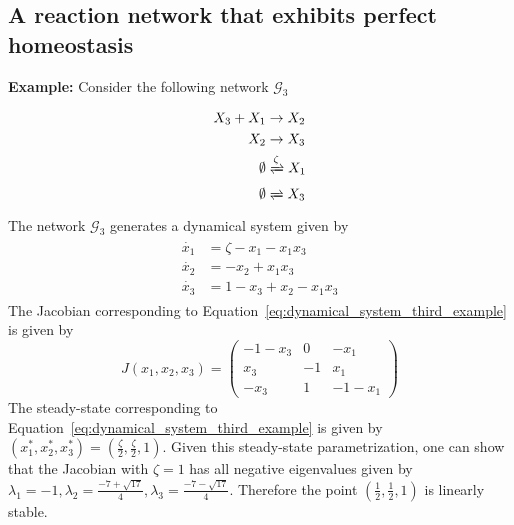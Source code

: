 \documentclass[11pt]{article}
\theoremstyle{plain}
\theoremstyle{definition}
\theoremstyle{remark}
\newcommand\GG{\mathcal{G}}
\begin{document}
\subsection{A reaction network that exhibits perfect homeostasis}


\textbf{Example:} Consider the following network $\GG_3$


\begin{eqnarray}
\begin{split}
X_3 + X_1  &\rightarrow X_2 \\
X_2       &\rightarrow X_3 \\
\emptyset &\xrightleftharpoons[]{\zeta} X_1 \\
\emptyset &\xrightleftharpoons[]{} X_3	 
\end{split}
\end{eqnarray}
%
The network $\GG_3$ generates a dynamical system given by
\begin{eqnarray}\label{eq:dynamical_system_third_example}
\begin{split}
\dot{x_1} &= \zeta - x_1 -x_1x_3 \\
\dot{x_2} &=  - x_2 + x_1x_3 \\
\dot{x_3} &= 1 - x_3 + x_2- x_1x_3
\end{split}
\end{eqnarray}
%
The Jacobian corresponding to Equation~\ref{eq:dynamical_system_third_example} is given by
$$J(x_1,x_2,x_3)=
\begin{pmatrix} 
-1-x_3 &  0   & -x_1 \\
x_3  & -1   & x_1 \\
-x_3  & 1 & -1-x_1 
\end{pmatrix}
$$
%
The steady-state corresponding to Equation~\ref{eq:dynamical_system_third_example} is given by $(x^*_1,x^*_2,x^*_3)=\left(\frac{\zeta}{2}, \frac{\zeta}{2}, 1\right)$. Given this steady-state parametrization, one can show that the Jacobian with $\zeta=1$ has all negative eigenvalues given by $\lambda_1 = -1,\lambda_2 = \frac{-7+\sqrt{17}}{4},\lambda_3 = \frac{-7-\sqrt{17}}{4}$. Therefore the point $(\frac{1}{2},\frac{1}{2},1)$ is linearly stable. \\
  

\begin{comment}
the Jacobian is given by
$$J(x^*_1,x^*_2,x^*_3)=
\begin{pmatrix} 
-2 &  0   & -\frac{1}{2} \\
1  & -1   & \frac{1}{2} \\
-1 & 1 & -\frac{3}{2} 
\end{pmatrix}
$$
%
The characteristic equation corresponding to this Jacobian is $det(J(x^*_1,x^*_2,x^*_3) - \lambda I)=0$, which gives $-\lambda^3 -4.5\lambda^2 - 5.5\lambda -2= 0$. This gives that the eigenvalues are $\lambda_1 = -1,\lambda_2 = \frac{-7+\sqrt{17}}{4},\lambda_3 = \frac{-7-\sqrt{17}}{4}$.
\end{comment}
\end{document}
